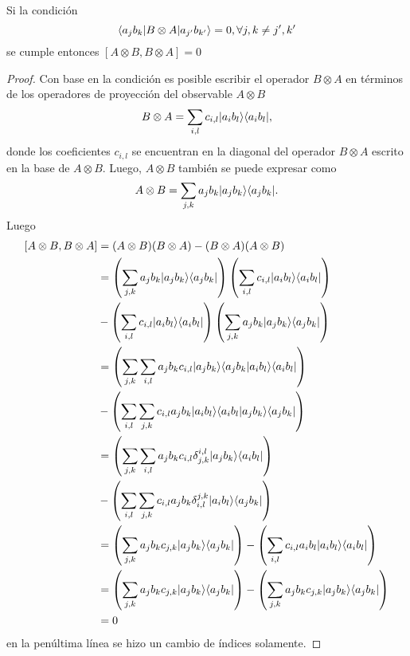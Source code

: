 \documentclass[12pt,oneside]{book}\raggedbottom{}
\begin{document}
\begin{proposition}
    Si la condición \[\langle a_j b_k|B\otimes A|a_{j'}b_{k'}\rangle=0, \forall j,k\ne j',k'\] se cumple entonces $[A\otimes B,B \otimes A]=0$  
\end{proposition}
\begin{proof}
    Con base en la condición es posible escribir el operador $B\otimes A$  en términos de los operadores de proyección del observable $A\otimes B$ \[ B\otimes A = \sum_{i,l} c_{i,l} |a_{i}b_{l}\rangle \langle a_i b_l|,\] donde los coeficientes $c_{i,l}$ se encuentran en la diagonal del operador $B\otimes A$ escrito en la base de $A\otimes B$. Luego, $A\otimes B $ también se puede expresar como \[A\otimes B= \sum_{j,k} a_j b_k |a_{j}b_{k}\rangle \langle a_j b_k|.\] Luego \[\begin{split}
        [A\otimes B,B \otimes A]&= (A\otimes B) (B\otimes A)-(B\otimes A) (A\otimes B)\\
        &=\left(\sum_{j,k} a_j b_k |a_{j}b_{k}\rangle \langle a_j b_k|\right)\left(\sum_{i,l} c_{i,l} |a_{i}b_{l}\rangle \langle a_i b_l|\right)\\
		&-\left( \sum_{i,l} c_{i,l} |a_{i}b_{l}\rangle \langle a_i b_l|\right)\left(\sum_{j,k} a_j b_k |a_{j}b_{k}\rangle \langle a_j b_k|\right)\\
		&=\left(\sum_{j,k} \sum_{i,l} a_j b_k  c_{i,l}|a_{j}b_{k}\rangle \langle a_j b_k|a_{i}b_{l}\rangle \langle a_i b_l|\right)\\
		&-\left( \sum_{i,l} \sum_{j,k} c_{i,l} a_j b_k |a_{i}b_{l}\rangle \langle a_i b_l|a_{j}b_{k}\rangle \langle a_j b_k|\right)\\
		&=\left(\sum_{j,k} \sum_{i,l} a_j b_k  c_{i,l} \delta_{j,k}^{i,l}|a_{j}b_{k}\rangle \langle a_i b_l|\right)\\
		&-\left( \sum_{i,l} \sum_{j,k} c_{i,l} a_j b_k \delta_{i,l}^{j,k}|a_{i}b_{l}\rangle \langle a_j b_k|\right)\\
		&=\left(\sum_{j,k}  a_j b_k  c_{j,k} |a_{j}b_{k}\rangle \langle a_j b_k|\right)-\left( \sum_{i,l} c_{i,l} a_i b_l |a_{i}b_{l}\rangle \langle a_i b_l|\right)\\
		&=\left(\sum_{j,k}  a_j b_k  c_{j,k} |a_{j}b_{k}\rangle \langle a_j b_k|\right)-\left( \sum_{j,k} a_j b_k  c_{j,k} |a_{j}b_{k}\rangle \langle a_j b_k|\right)\\
		&=0
	\end{split}\] en la penúltima línea se hizo un cambio de índices solamente. 






\end{proof}
\end{document}

